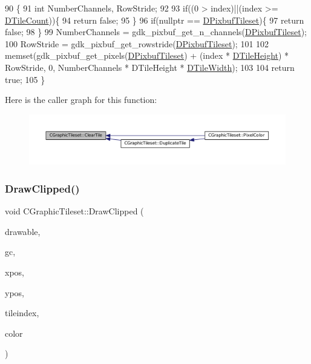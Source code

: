 \begin{DoxyCode}
90                                         \{
91     \textcolor{keywordtype}{int} NumberChannels, RowStride;
92     
93     \textcolor{keywordflow}{if}((0 > index)||(index >= \hyperlink{classCGraphicTileset_a39d942b370e47f441bf97385eb1037c8}{DTileCount}))\{
94         \textcolor{keywordflow}{return} \textcolor{keyword}{false};
95     \}
96     \textcolor{keywordflow}{if}(\textcolor{keyword}{nullptr} == \hyperlink{classCGraphicTileset_a5d5adfcdbb347a6df3f57535ca08e3ef}{DPixbufTileset})\{
97         \textcolor{keywordflow}{return} \textcolor{keyword}{false};
98     \}    
99     NumberChannels = gdk\_pixbuf\_get\_n\_channels(\hyperlink{classCGraphicTileset_a5d5adfcdbb347a6df3f57535ca08e3ef}{DPixbufTileset});
100     RowStride = gdk\_pixbuf\_get\_rowstride(\hyperlink{classCGraphicTileset_a5d5adfcdbb347a6df3f57535ca08e3ef}{DPixbufTileset});
101 
102     memset(gdk\_pixbuf\_get\_pixels(\hyperlink{classCGraphicTileset_a5d5adfcdbb347a6df3f57535ca08e3ef}{DPixbufTileset}) + (index * 
      \hyperlink{classCGraphicTileset_af48f32e07d5fe69afd5f764318cc3244}{DTileHeight}) * RowStride, 0, NumberChannels * DTileHeight * 
      \hyperlink{classCGraphicTileset_a2d0c7d19865b81911a3a43d5cae50e00}{DTileWidth});
103     
104     \textcolor{keywordflow}{return} \textcolor{keyword}{true};
105 \}
\end{DoxyCode}
Here is the caller graph for this function\+:
\nopagebreak
\begin{figure}[H]
\begin{center}
\leavevmode
\includegraphics[width=350pt]{classCGraphicTileset_aefeefc9e2ad01ceb8a781bd455859f76_icgraph}
\end{center}
\end{figure}
\hypertarget{classCGraphicTileset_a104935351be4c465f3ff08c111455d19}{}\label{classCGraphicTileset_a104935351be4c465f3ff08c111455d19} 
\subsubsection{\texorpdfstring{Draw\+Clipped()}{DrawClipped()}}
{\footnotesize\ttfamily void C\+Graphic\+Tileset\+::\+Draw\+Clipped (\begin{DoxyParamCaption}\item[{Gdk\+Drawable $\ast$}]{drawable,  }\item[{Gdk\+GC $\ast$}]{gc,  }\item[{gint}]{xpos,  }\item[{gint}]{ypos,  }\item[{int}]{tileindex,  }\item[{guint32}]{color }\end{DoxyParamCaption})}




